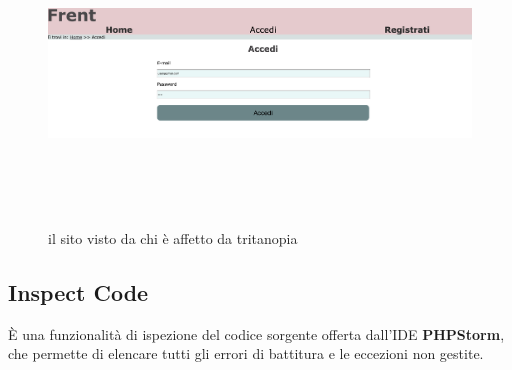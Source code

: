 \documentclass[1_relazione.tex]{subfiles}
\begin{document}
    \newpage
    \begin{figure}[h!]
        \centering
        \includegraphics[width=13cm, height=8cm]{immagini/Tritanopia.png}
        \caption{il sito visto da chi \`{e} affetto da tritanopia}
    \end{figure}

    \subsection{Inspect Code}
    \`{E} una funzionalit\`{a} di ispezione del codice sorgente offerta dall'IDE \textbf{PHPStorm}, che permette di elencare tutti gli errori di battitura e le eccezioni non gestite.
\end{document}
